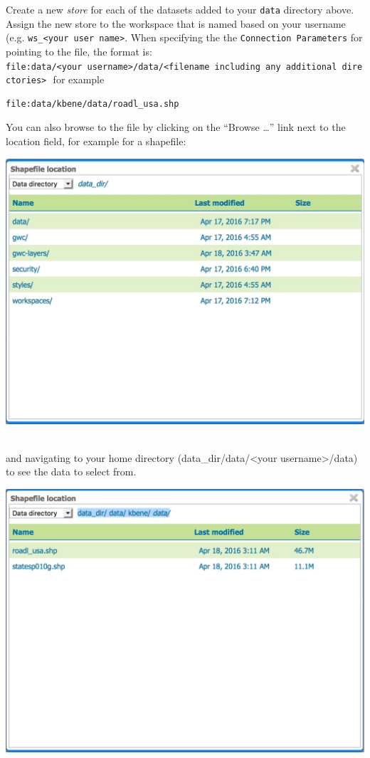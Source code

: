 \documentclass[]{book}
\begin{document}
Create a new \emph{store} for each of the datasets added to your
\texttt{data} directory above. Assign the new store to the workspace
that is named based on your username (e.g.
\texttt{ws\_\textless{}your\ user\ name\textgreater{}}. When specifying
the the \texttt{Connection\ Parameters} for pointing to the file, the
format is:
\texttt{file:data/\textless{}your\ username\textgreater{}/data/\textless{}filename\ including\ any\ additional\ directories\textgreater{}} 
for example

\begin{verbatim}
file:data/kbene/data/roadl_usa.shp
\end{verbatim}

You can also browse to the file by clicking on the ``Browse \ldots{}''
link next to the location field, for example for a shapefile:

\includegraphics{images/GeoServer_Browse.jpg}~

and navigating to your home directory (data\_dir/data/\textless{}your
username\textgreater{}/data) to see the data to select from.

\includegraphics{images/GeoServer_SelectData.jpg}~
\end{document}
